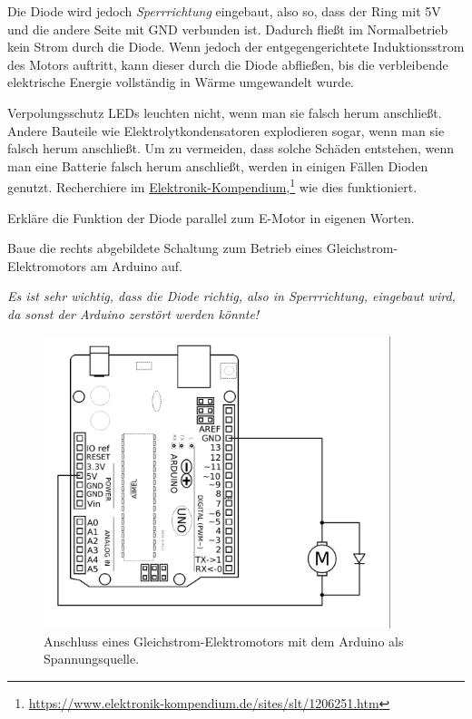 Die Diode wird jedoch \emph{Sperrrichtung} eingebaut, also so, dass der Ring mit 5V und die andere Seite mit GND verbunden ist. Dadurch fließt im Normalbetrieb kein Strom durch die Diode. Wenn jedoch der entgegengerichtete Induktionsstrom des Motors auftritt, kann dieser durch die Diode abfließen, bis die verbleibende elektrische Energie vollständig in Wärme umgewandelt wurde.

\begin{recherche}{Verpolungsschutz}
	LEDs leuchten nicht, wenn man sie falsch herum anschließt. Andere Bauteile wie Elektrolytkondensatoren explodieren sogar, wenn man sie falsch herum anschließt. Um zu vermeiden, dass solche Schäden entstehen, wenn man eine Batterie falsch herum anschließt, werden in einigen Fällen Dioden genutzt. Recherchiere im \href{https://www.elektronik-kompendium.de/sites/slt/1206251.htm}{Elektronik-Kompendium},\footnote{\url{https://www.elektronik-kompendium.de/sites/slt/1206251.htm}} wie dies funktioniert.
\end{recherche}

\medskip
\begin{minipage}[t]{0.5\textwidth}
	\begin{aufgabe}
		Erkläre die Funktion der Diode parallel zum E-Motor in eigenen Worten.
		
		\smallskip
		Baue die rechts abgebildete Schaltung zum Betrieb eines Gleichstrom-Elektromotors am Arduino auf.
		
		\bigskip
		\ausrufezeichen \emph{Es ist sehr wichtig, dass die Diode richtig, also in Sperrrichtung, eingebaut wird, da sonst der Arduino zerstört werden könnte!}
	\end{aufgabe}
\end{minipage}
\hfill
\begin{minipage}[t]{0.48\textwidth}
	\begin{figure}[H]
		\centering
		\includegraphics[width=0.9\textwidth]{./Zeichnungen/Schaltplan-Motoranschluss-einfach.png}
		\caption{Anschluss eines Gleichstrom-Elektromotors mit dem Arduino als Spannungsquelle.}
	\end{figure}
\end{minipage}
\medskip

